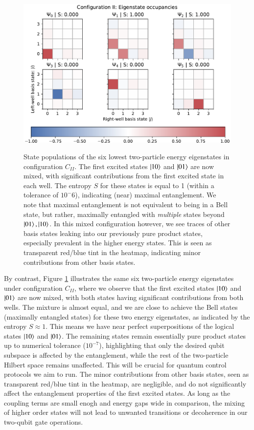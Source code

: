 \documentclass{subfiles}
\begin{document}
\begin{figure}[h!]
  \centering
  \includegraphics[width=\textwidth]{figs/state_populations_II.pdf}
  \label{fig:populations_II}
  \caption{State populations of the six lowest two-particle energy eigenstates in configuration $C_{II}$. The first excited states $\ket{10}$ and $\ket{01}$ are now mixed, with significant contributions from the first excited state in each well. The entropy $S$ for these states is equal to 1 (within a tolerance of $10^-6$), indicating (near) maximal entanglement. We note that maximal entanglement is not equivalent to being in a Bell state, but rather, maximally entangled with \emph{multiple} states beyond $\ket{01}, \ket{10}$. In this mixed configuration however, we see traces of other basis states leaking into our previously pure product states, especially prevalent in the higher energy states. This is seen as transparent red/blue tint in the heatmap, indicating minor contributions from other basis states.}
\end{figure}

By contrast, Figure \ref{fig:populations_II} illustrates the same six two-particle energy eigenstates under configuration $C_{II}$, where we observe that the first excited states $\ket{10}$ and $\ket{01}$ are now mixed, with both states having significant contributions from both wells. The mixture is almost equal, and we are close to achieve the Bell states (maximally entangled states) for these two energy eigenstates, as indicated by the entropy $S \approx 1$. This means we have near perfect superpositions of the logical states $\ket{10}$ and $\ket{01}$. The remaining states remain essentially pure product states up to numerical tolerance ($10^{-7}$), highlighting that only the desired qubit subspace is affected by the entanglement, while the rest of the two-particle Hilbert space remains unaffected. This will be crucial for quantum control protocols we aim to run. The minor contributions from other basis states, seen as transparent red/blue tint in the heatmap, are negligible, and do not significantly affect the entanglement properties of the first excited states. As long as the coupling terms are small enogh and energy gaps wide in comparison, the mixing of higher order states will not lead to unwanted transitions or decoherence in our two-qubit gate operations.
\\
\end{document}
